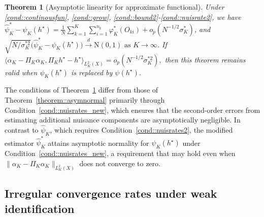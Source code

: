 \documentclass[11pt]{article}
\theoremstyle{plain}
\newtheorem{theorem}{Theorem}
\theoremstyle{definition}
\theoremstyle{remark}
\theoremstyle{definition}
\begin{document}
 \begin{theorem}[Asymptotic linearity for approximate functional]
 \label{theorem::asymnormalgeneral}
Under \ref{cond::continousfun}, \ref{cond::grow}, \ref{cond::bound2}-\ref{cond::nuisrate2}, we have  \(\widehat{\psi}_K^* - \psi_K(h^\star) = \frac{1}{N} \sum_{k=1}^K   \sum_{i=1}^{n_k} \varphi_K^*(O_{ki}) + o_p(N^{-1/2}\sigma_K^{*})\),  and  \(\sqrt{N/\sigma_K^{*2}} \big( \widehat{\psi}_K^* - \psi_K(h^\star) \big) \overset{d}{\to} \text{N}(0,1) \text{ as } K \to \infty\). If $\big\langle \alpha_K - \Pi_{K} \alpha_K, \Pi_{K} h^\star - h^\star \big\rangle_{L^2_K(X)} = o_p(N^{-1/2}\sigma_K^{*2}),$ then this theorem remains valid when \(   \psi_K(h^\star) \) is replaced by \(   \psi(h^{\star}) \).  

\end{theorem}
The conditions of Theorem~\ref{theorem::asymnormalgeneral} differ from those of
Theorem~\ref{theorem::asymnormal} primarily through
Condition~\ref{cond::nuisrates_new}, which ensures that the second-order errors
from estimating additional nuisance components are asymptotically negligible. In
contrast to \(\widehat{\psi}_K\), which requires
Condition~\ref{cond::nuisrates2}, the modified estimator
\(\widehat{\psi}_K^*\) attains asymptotic normality for \(\psi_K(h^\star)\)
under Condition~\ref{cond::nuisrates_new}, a requirement that may hold even when
\(\|\alpha_K - \Pi_K \alpha_K\|_{L^2_K(X)}\) does not converge to zero.


 


\label{cond::nuisrates1} 

\subsection{Irregular convergence rates under weak identification}
\label{sec::weakident}
\end{document}
